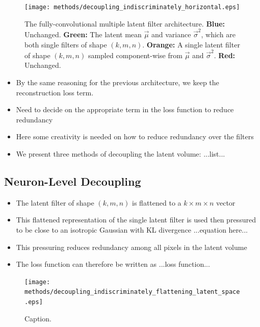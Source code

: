 \begin{figure}[h!]
\centering
\captionsetup{justification=centering}
\texttt{[image: methods/decoupling\_indiscriminately\_horizontal.eps]}
\caption{The fully-convolutional multiple latent filter architecture. \textbf{Blue:} Unchanged. \textbf{Green:} The latent mean $\vec{\mu}$ and variance $\vec{\sigma}^2$, which are both single filters of shape $(k, m, n)$. \textbf{Orange:} A single latent filter of shape $(k, m, n)$ sampled component-wise from $\vec{\mu}$ and $\vec{\sigma}^2$. \textbf{Red:} Unchanged.}
\label{fig:decoupling_indiscriminately_horizontal}
\end{figure}


\begin{itemize}
\item By the same reasoning for the previous architecture, we keep the reconstruction loss term. 
\item Need to decide on the appropriate term in the loss function to reduce redundancy
\item Here some creativity is needed on how to reduce redundancy over the filters
\item We present three methods of decoupling the latent volume: ...list...
\end{itemize}

%
%
\subsection{Neuron-Level Decoupling}
\begin{itemize}
\item The latent filter of shape $(k, m, n)$ is flattened to a $k \times m \times n$ vector
\item This flattened representation of the single latent filter is used then pressured to be close to an isotropic Gaussian with KL divergence ...equation here...
\item This pressuring reduces redundancy among all pixels in the latent volume
\item The loss function can therefore be written as ...loss function...
\end{itemize}

\begin{figure}[H]
\centering
\captionsetup{justification=centering}
\texttt{[image: methods/decoupling\_indiscriminately\_flattening\_latent\_space.eps]}
\caption{Caption.}
\label{fig:decoupling_indiscriminately_flattening_latent_space}
\end{figure}

